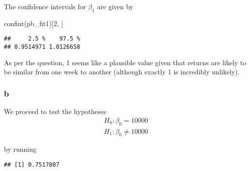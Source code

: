 \documentclass[
]{article}
\newenvironment{Shaded}{\begin{snugshade}}{\end{snugshade}}
\newcommand{\AttributeTok}[1]{\textcolor[rgb]{0.77,0.63,0.00}{#1}}
\newcommand{\ConstantTok}[1]{\textcolor[rgb]{0.00,0.00,0.00}{#1}}
\newcommand{\DecValTok}[1]{\textcolor[rgb]{0.00,0.00,0.81}{#1}}
\newcommand{\FunctionTok}[1]{\textcolor[rgb]{0.00,0.00,0.00}{#1}}
\newcommand{\NormalTok}[1]{#1}
\newcommand{\OtherTok}[1]{\textcolor[rgb]{0.56,0.35,0.01}{#1}}
\newcommand{\SpecialCharTok}[1]{\textcolor[rgb]{0.00,0.00,0.00}{#1}}
\begin{document}
The confidence intervals for \(\beta_1\) are given by

\begin{Shaded}
\begin{Highlighting}[]
\FunctionTok{confint}\NormalTok{(pb\_fit1)[}\DecValTok{2}\NormalTok{, ]}
\end{Highlighting}
\end{Shaded}

\begin{verbatim}
##     2.5 %    97.5 % 
## 0.9514971 1.0126658
\end{verbatim}

As per the question, 1 seems like a plausible value given that returns
are likely to be similar from one week to another (although exactly 1 is
incredibly unlikely).

\hypertarget{b}{%
\subsubsection*{b}\label{b}}

We proceed to test the hypotheses \[
\begin{gather}
H_0:\beta_0 = 10000 \\
H_1:\beta_0 \neq 10000
\end{gather}
\]

by running

\begin{Shaded}
\end{Shaded}

\begin{verbatim}
## [1] 0.7517807
\end{verbatim}
\end{document}
